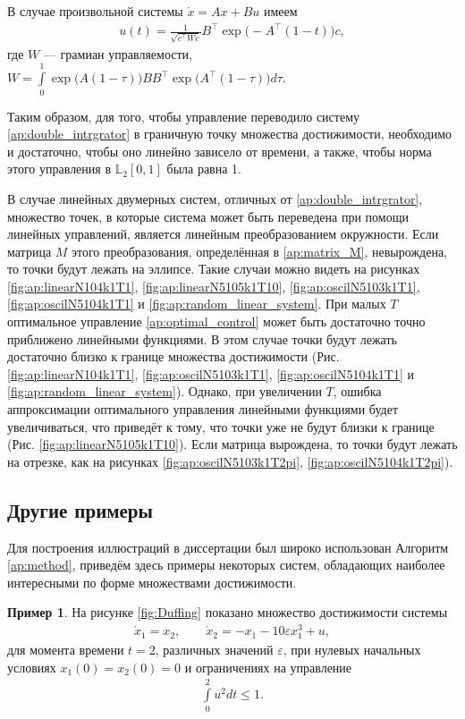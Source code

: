 \documentclass[../main.tex]{subfiles}
\begin{document}
 В случае произвольной системы $\dot{x} =Ax + Bu$ имеем
 \begin{gather}\label{ap:optimal_control}
 	u(t) = \frac{1}{\sqrt{c^{\top}Wc}} B^{\top} \operatorname{exp}\big(-A^{\top}(1-t)\big) c,
 \end{gather}
 где $W$ --- грамиан управляемости, $W = \int\limits_{0}^{1} \operatorname{exp}\big(A(1-\tau)\big) B B^{\top} \operatorname{exp}\big(A^{\top}(1-\tau)\big) d\tau$.
 
 Таким образом, для того, чтобы управление переводило систему \eqref{ap:double_intrgrator} в граничную точку множества достижимости, необходимо и достаточно, чтобы оно линейно зависело от времени, а также, чтобы норма этого управления в $\mathbb{L}_2[0,1]$ была равна 1. 
 
 В случае линейных двумерных систем, отличных от \eqref{ap:double_intrgrator}, множество точек, в которые система может быть переведена при помощи линейных управлений, является линейным преобразованием окружности.
 Если матрица $M$ этого преобразования, определённая в \eqref{ap:matrix_M}, невырождена, то точки будут лежать на эллипсе. 
 Такие случаи можно видеть на рисунках \ref{fig:ap:linearN104k1T1}, \ref{fig:ap:linearN5105k1T10}, \ref{fig:ap:oscilN5103k1T1}, \ref{fig:ap:oscilN5104k1T1} и \ref{fig:ap:random_linear_system}.
 При малых $T$ оптимальное управление \eqref{ap:optimal_control} может быть достаточно точно приближено линейными функциями. 
 В этом случае точки будут лежать достаточно близко к границе множества достижимости (Рис. \ref{fig:ap:linearN104k1T1}, \ref{fig:ap:oscilN5103k1T1}, \ref{fig:ap:oscilN5104k1T1} и \ref{fig:ap:random_linear_system}).
 Однако, при увеличении $T$, ошибка аппроксимации оптимального управления линейными функциями будет увеличиваться, что приведёт к тому, что точки уже не будут близки к границе (Рис. \ref{fig:ap:linearN5105k1T10}). 
 Если матрица вырождена, то точки будут лежать на отрезке, как на рисунках \ref{fig:ap:oscilN5103k1T2pi}, \ref{fig:ap:oscilN5104k1T2pi}).
 
 \subsection{Другие примеры}
 
 Для построения иллюстраций в диссертации был широко использован Алгоритм \ref{ap:method}, приведём здесь примеры некоторых систем, обладающих наиболее интересными по форме множествами достижимости.
 
 \textbf{Пример 1}. На рисунке \ref{fig:Duffing} показано множество достижимости системы 
 \begin{gather}\label{ap:Duffing}
 	\dot{x}_1 = x_2, \qquad
 	\dot{x}_2 = -x_1 - 10 \varepsilon x_1^3 + u,
 \end{gather}
 для момента времени $t = 2$, различных значений $\varepsilon$, при нулевых начальных условиях $x_1(0) = x_2(0) = 0 $ и ограничениях на управление 
 \begin{gather}\label{ap:Duffing_controls}
 	\int\limits_0^2u^2dt \leqslant 1.
 \end{gather}
 	 
\end{document}

